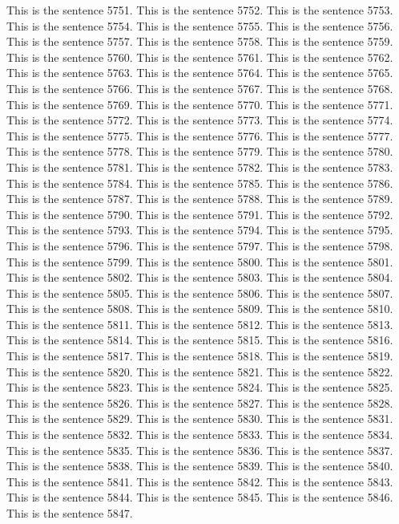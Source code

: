 \documentclass{article}
\begin{document}
This is the sentence 5751.
This is the sentence 5752.
This is the sentence 5753.
This is the sentence 5754.
This is the sentence 5755.
This is the sentence 5756.
This is the sentence 5757.
This is the sentence 5758.
This is the sentence 5759.
This is the sentence 5760.
This is the sentence 5761.
This is the sentence 5762.
This is the sentence 5763.
This is the sentence 5764.
This is the sentence 5765.
This is the sentence 5766.
This is the sentence 5767.
This is the sentence 5768.
This is the sentence 5769.
This is the sentence 5770.
This is the sentence 5771.
This is the sentence 5772.
This is the sentence 5773.
This is the sentence 5774.
This is the sentence 5775.
This is the sentence 5776.
This is the sentence 5777.
This is the sentence 5778.
This is the sentence 5779.
This is the sentence 5780.
This is the sentence 5781.
This is the sentence 5782.
This is the sentence 5783.
This is the sentence 5784.
This is the sentence 5785.
This is the sentence 5786.
This is the sentence 5787.
This is the sentence 5788.
This is the sentence 5789.
This is the sentence 5790.
This is the sentence 5791.
This is the sentence 5792.
This is the sentence 5793.
This is the sentence 5794.
This is the sentence 5795.
This is the sentence 5796.
This is the sentence 5797.
This is the sentence 5798.
This is the sentence 5799.
This is the sentence 5800.
This is the sentence 5801.
This is the sentence 5802.
This is the sentence 5803.
This is the sentence 5804.
This is the sentence 5805.
This is the sentence 5806.
This is the sentence 5807.
This is the sentence 5808.
This is the sentence 5809.
This is the sentence 5810.
This is the sentence 5811.
This is the sentence 5812.
This is the sentence 5813.
This is the sentence 5814.
This is the sentence 5815.
This is the sentence 5816.
This is the sentence 5817.
This is the sentence 5818.
This is the sentence 5819.
This is the sentence 5820.
This is the sentence 5821.
This is the sentence 5822.
This is the sentence 5823.
This is the sentence 5824.
This is the sentence 5825.
This is the sentence 5826.
This is the sentence 5827.
This is the sentence 5828.
This is the sentence 5829.
This is the sentence 5830.
This is the sentence 5831.
This is the sentence 5832.
This is the sentence 5833.
This is the sentence 5834.
This is the sentence 5835.
This is the sentence 5836.
This is the sentence 5837.
This is the sentence 5838.
This is the sentence 5839.
This is the sentence 5840.
This is the sentence 5841.
This is the sentence 5842.
This is the sentence 5843.
This is the sentence 5844.
This is the sentence 5845.
This is the sentence 5846.
This is the sentence 5847.
\end{document}
